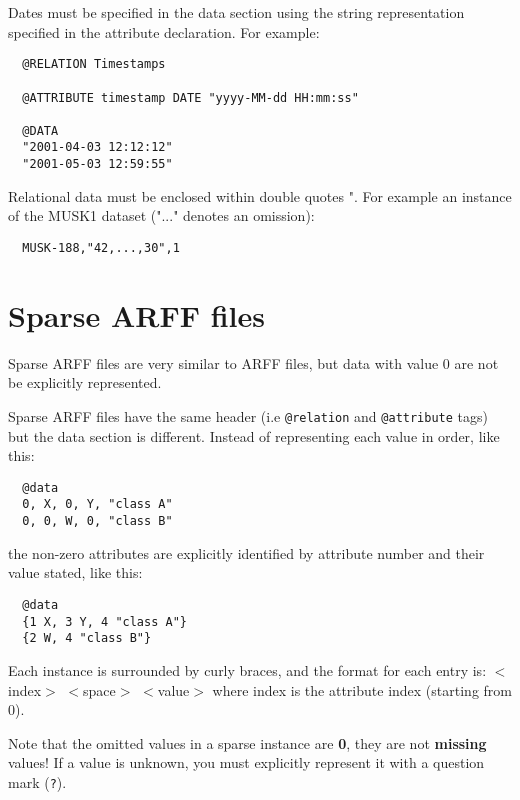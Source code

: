 \noindent Dates must be specified in the data section using the string representation specified in the attribute declaration. For example:

\begin{verbatim}
  @RELATION Timestamps

  @ATTRIBUTE timestamp DATE "yyyy-MM-dd HH:mm:ss"

  @DATA
  "2001-04-03 12:12:12"
  "2001-05-03 12:59:55"
\end{verbatim}

\noindent Relational data must be enclosed within double quotes ". For example an instance of the MUSK1 dataset ("..." denotes an omission):

\begin{verbatim}
  MUSK-188,"42,...,30",1
\end{verbatim}


\section{Sparse ARFF files}
Sparse ARFF files are very similar to ARFF files, but data with value 0 are not be explicitly represented.

Sparse ARFF files have the same header (i.e \texttt{@relation} and \texttt{@attribute} tags) but the data section is different. Instead of representing each value in order, like this:

\begin{verbatim}
  @data
  0, X, 0, Y, "class A"
  0, 0, W, 0, "class B"
\end{verbatim}

\noindent the non-zero attributes are explicitly identified by attribute number and their value stated, like this:

\begin{verbatim}
  @data
  {1 X, 3 Y, 4 "class A"}
  {2 W, 4 "class B"}
\end{verbatim}

\noindent Each instance is surrounded by curly braces, and the format for each entry is: $<$index$>$ $<$space$>$ $<$value$>$ where index is the attribute index (starting from 0).

Note that the omitted values in a sparse instance are \textbf{0}, they are not \textbf{missing} values! If a value is unknown, you must explicitly represent it with a question mark (\texttt{?}).

